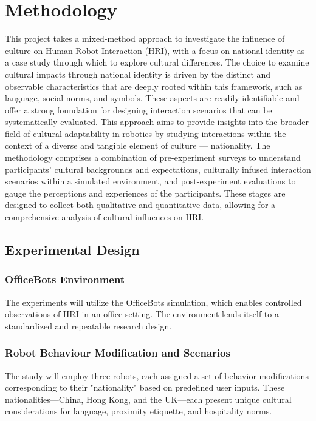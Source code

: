 \chapter{Methodology}

This project takes a mixed-method approach to investigate the influence of culture on Human-Robot Interaction (HRI), with a focus on national identity as a case study through which to explore cultural differences. The choice to examine cultural impacts through national identity is driven by the distinct and observable characteristics that are deeply rooted within this framework, such as language, social norms, and symbols. These aspects are readily identifiable and offer a strong foundation for designing interaction scenarios that can be systematically evaluated. This approach aims to provide insights into the broader field of cultural adaptability in robotics by studying interactions within the context of a diverse and tangible element of culture — nationality. The methodology comprises a combination of pre-experiment surveys to understand participants' cultural backgrounds and expectations, culturally infused interaction scenarios within a simulated environment, and post-experiment evaluations to gauge the perceptions and experiences of the participants. These stages are designed to collect both qualitative and quantitative data, allowing for a comprehensive analysis of cultural influences on HRI.

\section{Experimental Design}

\subsection{OfficeBots Environment}

The experiments will utilize the OfficeBots simulation, which enables controlled observations of HRI in an office setting. The environment lends itself to a standardized and repeatable research design.

\subsection{Robot Behaviour Modification and Scenarios}

The study will employ three robots, each assigned a set of behavior modifications corresponding to their "nationality" based on predefined user inputs. These nationalities—China, Hong Kong, and the UK—each present unique cultural considerations for language, proximity etiquette, and hospitality norms.

